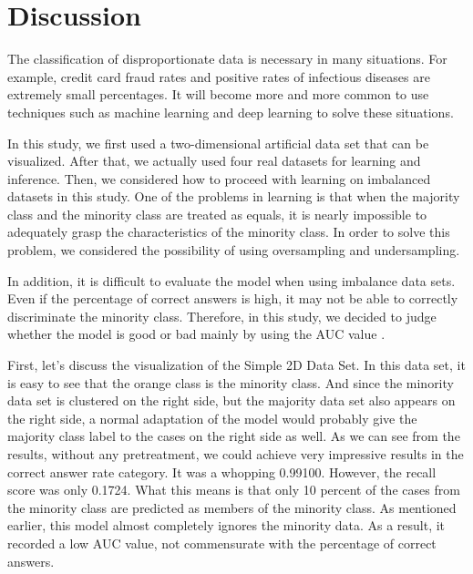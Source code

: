 \chapter{Discussion}

The classification of disproportionate data is necessary in many situations.
For example, credit card fraud rates and positive rates of infectious diseases are extremely small percentages. It will become more and more common to use techniques such as machine learning and deep learning to solve these situations.

In this study, we first used a two-dimensional artificial data set that can be visualized. After that, we actually used four real datasets for learning and inference.
Then, we considered how to proceed with learning on imbalanced datasets in this study.
One of the problems in learning is that when the majority class and the minority class are treated as equals, it is nearly impossible to adequately grasp the characteristics of the minority class. In order to solve this problem, we considered the possibility of using oversampling and undersampling. 

In addition, it is difficult to evaluate the model when using imbalance data sets. Even if the percentage of correct answers is high, it may not be able to correctly discriminate the minority class. Therefore, in this study, we decided to judge whether the model is good or bad mainly by using the AUC value \cite{ROC}.

First, let's discuss the visualization of the Simple 2D Data Set. In this data set, it is easy to see that the orange class is the minority class. And since the minority data set is clustered on the right side, but the majority data set also appears on the right side, a normal adaptation of the model would probably give the majority class label to the cases on the right side as well. As we can see from the results, without any pretreatment, we could achieve very impressive results in the correct answer rate category. It was a whopping 0.99100. However, the recall score was only 0.1724. 
What this means is that only 10 percent of the cases from the minority class are predicted as members of the minority class. As mentioned earlier, this model almost completely ignores the minority data. As a result, it recorded a low AUC value, not commensurate with the percentage of correct answers. 

